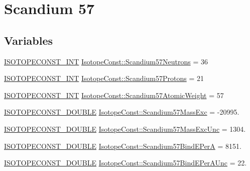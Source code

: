 \hypertarget{group___isotope_const-_scandium-_sc57}{}\section{Scandium 57}
\label{group___isotope_const-_scandium-_sc57}
\subsection*{Variables}
\begin{DoxyCompactItemize}
\item 
\mbox{\hyperlink{group___isotope_const-_macros_ga5f18360b3e99483a35c32d789e62621c}{I\+S\+O\+T\+O\+P\+E\+C\+O\+N\+S\+T\+\_\+\+I\+NT}} \mbox{\hyperlink{group___isotope_const-_scandium-_sc57_gad7ead766da420a4698639a63dd109228}{Isotope\+Const\+::\+Scandium57\+Neutrons}} = 36
\item 
\mbox{\hyperlink{group___isotope_const-_macros_ga5f18360b3e99483a35c32d789e62621c}{I\+S\+O\+T\+O\+P\+E\+C\+O\+N\+S\+T\+\_\+\+I\+NT}} \mbox{\hyperlink{group___isotope_const-_scandium-_sc57_ga127ad611692a7a7b9c477d9471a3cb0b}{Isotope\+Const\+::\+Scandium57\+Protons}} = 21
\item 
\mbox{\hyperlink{group___isotope_const-_macros_ga5f18360b3e99483a35c32d789e62621c}{I\+S\+O\+T\+O\+P\+E\+C\+O\+N\+S\+T\+\_\+\+I\+NT}} \mbox{\hyperlink{group___isotope_const-_scandium-_sc57_ga45893fbe6b3e331b1f31230e507ab41a}{Isotope\+Const\+::\+Scandium57\+Atomic\+Weight}} = 57
\item 
\mbox{\hyperlink{group___isotope_const-_macros_ga8f45a7272ce02c0b4c65c44636ed719a}{I\+S\+O\+T\+O\+P\+E\+C\+O\+N\+S\+T\+\_\+\+D\+O\+U\+B\+LE}} \mbox{\hyperlink{group___isotope_const-_scandium-_sc57_ga06aa97fada8c99640c038e983b62d9ba}{Isotope\+Const\+::\+Scandium57\+Mass\+Exc}} = -\/20995.
\item 
\mbox{\hyperlink{group___isotope_const-_macros_ga8f45a7272ce02c0b4c65c44636ed719a}{I\+S\+O\+T\+O\+P\+E\+C\+O\+N\+S\+T\+\_\+\+D\+O\+U\+B\+LE}} \mbox{\hyperlink{group___isotope_const-_scandium-_sc57_gac895ce54125c176b176532b05a9278b4}{Isotope\+Const\+::\+Scandium57\+Mass\+Exc\+Unc}} = 1304.
\item 
\mbox{\hyperlink{group___isotope_const-_macros_ga8f45a7272ce02c0b4c65c44636ed719a}{I\+S\+O\+T\+O\+P\+E\+C\+O\+N\+S\+T\+\_\+\+D\+O\+U\+B\+LE}} \mbox{\hyperlink{group___isotope_const-_scandium-_sc57_ga648365f3ce3bf0cf76eacc09f125d6b7}{Isotope\+Const\+::\+Scandium57\+Bind\+E\+PerA}} = 8151.
\item 
\mbox{\hyperlink{group___isotope_const-_macros_ga8f45a7272ce02c0b4c65c44636ed719a}{I\+S\+O\+T\+O\+P\+E\+C\+O\+N\+S\+T\+\_\+\+D\+O\+U\+B\+LE}} \mbox{\hyperlink{group___isotope_const-_scandium-_sc57_gaef4583993517e26aadefda91cdd04905}{Isotope\+Const\+::\+Scandium57\+Bind\+E\+Per\+A\+Unc}} = 22.

\end{DoxyCompactItemize}
